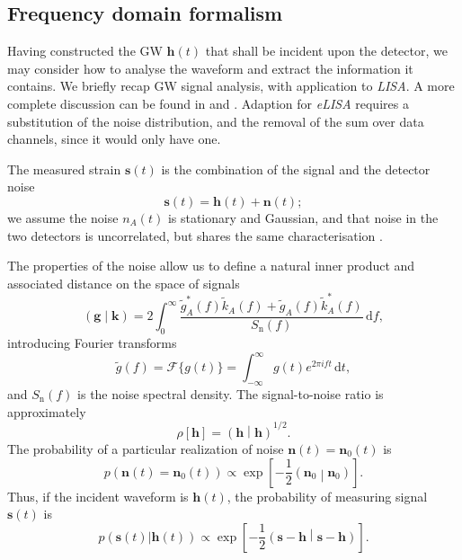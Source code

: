 \documentclass[useAMS,usedcolumn,usegraphicx,usenatbib]{mn2e}
\newcommand{\sub}[1]{\ensuremath{_\mathrm{#1}}}
\newcommand{\dd}{\ensuremath{\mathrm{d}}}
\newcommand{\intd}[4]{\ensuremath{\int_{#1}^{#2}{#3}\,\dd{#4}}}
\newcommand{\recip}[1]{\ensuremath{\frac{1}{#1}}}
\newcommand{\innerprod}[2]{\ensuremath{\left({#1}\middle|{#2}\right)}}
\begin{document}
\subsection{Frequency domain formalism}

Having constructed the GW $\boldsymbol{h}(t)$ that shall be incident upon the detector, we may consider how to analyse the waveform and extract the information it contains. We briefly recap GW signal analysis, with application to \textit{LISA}. A more complete discussion can be found in \citet{Finn1992} and \citet{Cutler1994}. Adaption for \textit{eLISA} requires a substitution of the noise distribution, and the removal of the sum over data channels, since it would only have one.

The measured strain $\boldsymbol{s}(t)$ is the combination of the signal and the detector noise
\begin{equation}
\boldsymbol{s}(t) = \boldsymbol{h}(t) + \boldsymbol{n}(t);
\end{equation}
we assume the noise $n_A(t)$ is stationary and Gaussian, and that noise in the two detectors is uncorrelated, but shares the same characterisation \citep{Cutler1998}.

The properties of the noise allow us to define a natural inner product and associated distance on the space of signals \citep{Cutler1994}
\begin{equation}
\innerprod{\boldsymbol{g}}{\boldsymbol{k}} = 2\intd{0}{\infty}{\frac{\tilde{g}_A^\ast(f)\tilde{k}_A(f) + \tilde{g}_A(f)\tilde{k}_A^\ast(f)}{S\sub{n}(f)}}{f},
\label{eq:inner}
\end{equation}
introducing Fourier transforms
\begin{equation}
\tilde{g}(f) = \mathscr{F}\{g(t)\} = \intd{-\infty}{\infty}{g(t)e^{2\pi i ft}}{t},
\end{equation}
and $S\sub{n}(f)$ is the noise spectral density. The signal-to-noise ratio is approximately
\begin{equation}
\rho[\boldsymbol{h}] = \innerprod{\boldsymbol{h}}{\boldsymbol{h}}^{1/2}.
\label{eq:SNR}
\end{equation}
The probability of a particular realization of noise $\boldsymbol{n}(t) = \boldsymbol{n}_0(t)$ is
\begin{equation}
p(\boldsymbol{n}(t) = \boldsymbol{n}_0(t)) \propto \exp\left[-\recip{2}\innerprod{\boldsymbol{n}_0}{\boldsymbol{n}_0}\right].
\end{equation}
Thus, if the incident waveform is $\boldsymbol{h}(t)$, the probability of measuring signal $\boldsymbol{s}(t)$ is
\begin{equation}
p(\boldsymbol{s}(t)|\boldsymbol{h}(t)) \propto \exp\left[-\recip{2}\innerprod{\boldsymbol{s}-\boldsymbol{h}}{\boldsymbol{s}-\boldsymbol{h}}\right].
\label{eq:sig_prob}
\end{equation}
\end{document}
